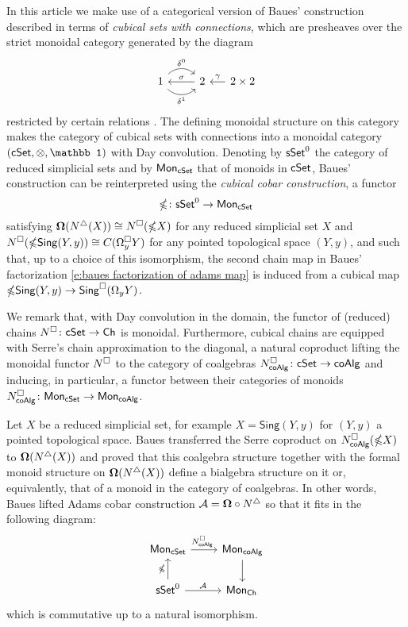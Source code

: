 In this article we make use of a categorical version of Baues' construction described in terms of \textit{cubical sets with connections}, which are presheaves over the strict monoidal category generated by the diagram
\begin{equation*}
\begin{tikzcd}
1 \arrow[r, out=45, in=135, "\delta^0"] \arrow[r, out=-45, in=-135, "\delta^1"'] & 2 \arrow[l, "\sigma"'] &[-10pt] \arrow[l, "\gamma"'] 2 \times 2
\end{tikzcd}
\end{equation*}
restricted by certain relations \cite{brown1981cubes, grandis2003cubical}.
The defining monoidal structure on this category makes the category of cubical sets with connections into a monoidal category $(\cSet, \otimes, \mathbb 1)$ with Day convolution.
Denoting by $\mathsf{sSet}^0$ the category of reduced simplicial sets and by $\mathsf{Mon}_{\mathsf{cSet}}$ that of monoids in $\mathsf{cSet}$, Baues' construction can be reinterpreted using the \textit{cubical cobar construction}, a functor
\begin{equation*}
\mathbb{\Omega} \colon \mathsf{sSet}^0 \to \mathsf{Mon}_{\mathsf{cSet}}
\end{equation*}
satisfying $\mathbf{\Omega}(N^{\triangle}(X)) \cong N^{\square}(\mathbb{\Omega} X)$ for any reduced simplicial set $X$ and $N^{\square}(\mathbb{\Omega} \mathsf{Sing}(Y, y)) \cong C(\Omega^{\square}_y Y)$ for any pointed topological space $(Y, y)$, and such that, up to a choice of this isomorphism, the second chain map in Baues' factorization \eqref{e:baues factorization of adams map} is induced from a cubical map $\mathbb{\Omega} \mathsf{Sing}(Y, y) \to \mathsf{Sing}^\square(\Omega_y Y)$.


We remark that, with Day convolution in the domain, the functor of (reduced) chains $N^{\square} \colon \mathsf{cSet} \to \mathsf{Ch}$ is monoidal.
Furthermore, cubical chains are equipped with Serre's chain approximation to the diagonal, a natural coproduct lifting the monoidal functor $N^{\square}$ to the category of coalgebras $N^{\square}_{\mathsf{coAlg}} \colon \mathsf{cSet} \to \mathsf{coAlg}$ and inducing, in particular, a functor between their categories of monoids $N^{\square}_{\mathsf{coAlg}} \colon \mathsf{Mon}_{\mathsf{cSet}} \to \mathsf{Mon}_{\mathsf{coAlg}}$.

Let $X$ be a reduced simplicial set, for example $X = \mathsf{Sing}(Y,y)$ for $(Y, y)$ a pointed topological space.
Baues transferred the Serre coproduct on $N^{\square}_{\mathsf{coAlg}}(\mathbb{\Omega} X)$ to $\mathbf{\Omega}(N^{\triangle}(X))$ and proved that this coalgebra structure together with the formal monoid structure on $\mathbf{\Omega}(N^{\triangle}(X))$ define a bialgebra structure on it or, equivalently, that of a monoid in the category of coalgebras.
In other words, Baues lifted Adams cobar construction $\mathcal A = \mathbf{\Omega} \circ N^{\triangle}$ so that it fits in the following diagram:
\begin{equation*}
\begin{tikzcd}
\Mon_{\cSet} \arrow[r, "\cchains_\coAlg \ "] & \Mon_{\coAlg} \arrow[d] \\
\sSet^0 \arrow[r, "\mathcal A"] \arrow[u, "\gcobar"] & \Mon_{\Ch} \,
\end{tikzcd}
\end{equation*}
which is commutative up to a natural isomorphism.

